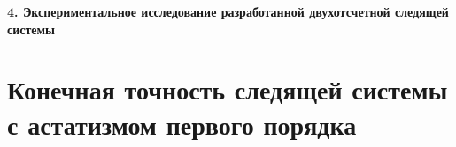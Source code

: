 \newpage
\begin{center}
  \textbf{\large 4. Экспериментальное исследование разработанной двухотсчетной следящей системы}
\end{center}

\section{Конечная точность следящей системы с астатизмом первого порядка}







